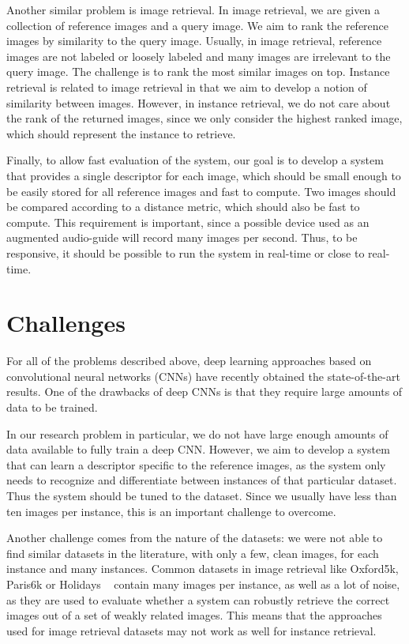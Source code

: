 Another similar problem is image retrieval. In image retrieval,
we are given a collection of reference images and a query image.
We aim to rank the reference images by similarity to the query image.
Usually, in image retrieval, reference images are not labeled or loosely
labeled and many images are irrelevant to the query image. The challenge
is to rank the most similar images on top.
Instance retrieval is related to image retrieval in that we aim to
develop a notion of similarity between images. However, in instance
retrieval, we do not care about the rank of the returned images, since
we only consider the highest ranked image, which should represent the
instance to retrieve.

Finally, to allow fast evaluation of the system, our goal is to develop
a system that provides a single descriptor for each image, which should
be small enough to be easily stored for all reference images and fast
to compute.
Two images should be compared according to a distance metric, which should
also be fast to compute. This requirement is important, since a possible
device used as an augmented audio-guide will record many images per second.
Thus, to be responsive, it should be possible to run the system in
real-time or close to real-time.


\section{Challenges}
For all of the problems described above, deep learning approaches
based on convolutional neural networks (CNNs) have recently obtained
the state-of-the-art results. One of the drawbacks of deep CNNs is that
they require large amounts of data to be trained.

In our research problem in particular, we do not
have large enough amounts of data available to fully train a deep CNN.
However, we aim to develop a system that can learn a descriptor
specific to the reference images,
as the system only needs to recognize and differentiate between
instances of that particular dataset. Thus the system should be tuned to
the dataset. Since we usually have less than ten images per instance,
this is an important challenge to overcome.

Another challenge comes from the nature of the datasets: we were not
able to find similar datasets in the literature, with only a few,
clean images, for each instance and many instances.
Common datasets in image retrieval like Oxford5k, Paris6k or Holidays
~\cite{philbin_object_2007,philbin_lost_2008,jegou_hamming_2008}
contain many images per instance, as well as a lot of noise,
as they are used to evaluate whether a system can robustly retrieve the
correct images out of a set of weakly related images.
This means that the approaches used for image retrieval datasets may
not work as well for instance retrieval.

